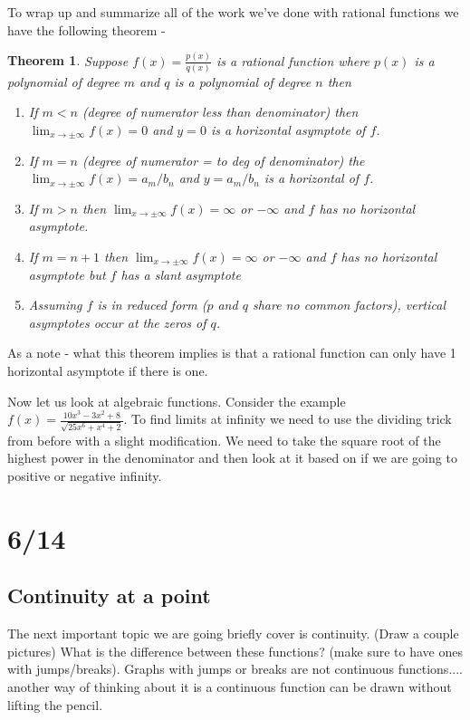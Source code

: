 \documentclass[12pt,reqno]{article}
\newtheorem{Theorem}{Theorem}
\theoremstyle{definition}
\begin{document}
To wrap up and summarize all of the work we've done with rational functions we have the following theorem - 
\begin{Theorem}
	Suppose $f(x) = \frac{p(x)}{q(x)}$ is a rational function where $p(x)$ is a polynomial of degree $m$ and $q$ is a polynomial of degree $n$ then 
	\begin{enumerate}
		\item[1)] If $m < n$ (degree of numerator less than denominator) then $\lim_{x\to\pm\infty} f(x) = 0$ and $y = 0$ is a horizontal asymptote of $f$. 
		\item[2)] If $m = n$ (degree of numerator = to deg of denominator) the $\lim_{x \to \pm\infty} f(x) = a_m/b_n$ and $y = a_m/b_n$ is a horizontal of $f$. 
		\item[3)] If $m > n$ then $\lim_{x \to \pm \infty} f(x) = \infty$ or $-\infty$ and $f$ has no horizontal asymptote. 
		\item[4)] If $m  = n+ 1$ then $\lim_{x \to \pm \infty} f(x) = \infty$ or $-\infty$ and $f$ has no horizontal asymptote but $f$ has a slant asymptote
		\item[5)] Assuming $f$ is in reduced form ($p$ and $q$ share no common factors), vertical asymptotes occur at the zeros of $q$. 
	\end{enumerate}
\end{Theorem}

As a note - what this theorem implies is that a rational function can only have 1 horizontal asymptote if there is one. 

Now let us look at algebraic functions. Consider the example $f(x) = \frac{10 x^3 - 3x^2 + 8}{\sqrt{25x^6 + x^4 + 2}}$. To find limits at infinity we need to use the dividing trick from before with a slight modification. We need to take the square root of the highest power in the denominator and then look at it based on if we are going to positive or negative infinity. 

\section{6/14}
\subsection{Continuity at a point}

The next important topic we are going briefly cover is continuity. (Draw a couple pictures) What is the difference between these functions? (make sure to have ones with jumps/breaks). Graphs with jumps or breaks are not continuous functions.... another way of thinking about it is a continuous function can be drawn without lifting the pencil. 
\end{document}

